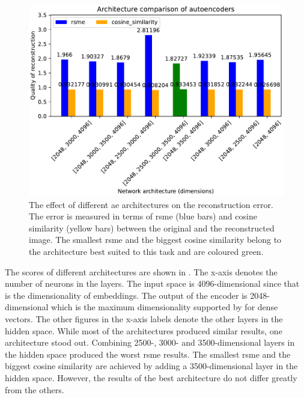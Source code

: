 \begin{figure}[!htb] %
    \centering
    \includegraphics[width=1\textwidth]{images/embeddings/autoencoder/ae_score_plot.pdf}
    \caption[Different \acs*{ae} architectures and their reconstruction error]{The effect of different \acs*{ae} architectures on the reconstruction error.
    The error is measured in terms of \acs*{rsme} (blue bars) and cosine similarity (yellow bars) between the original and the reconstructed image.
    The smallest \acs*{rsme} and the biggest cosine similarity belong to the architecture best suited to this task and are coloured green.
    }
    \label{fig:eval-ae-architecture}
\end{figure}

The scores of different architectures are shown in .
The x-axis denotes the number of neurons in the layers.
The input space is 4096-dimensional since that is the dimensionality of \infersent{} embeddings.
The output of the encoder is 2048-dimensional which is the maximum dimensionality supported by \databaseName{} for dense vectors.
The other figures in the x-axis labels denote the other layers in the hidden space.
While most of the architectures produced similar results, one architecture stood out.
Combining 2500-, 3000- and 3500-dimensional layers in the hidden space produced the worst \ac{rsme} results.
The smallest \ac{rsme} and the biggest cosine similarity are achieved by adding a 3500-dimensional layer in the hidden space.
However, the results of the best architecture do not differ greatly from the others.